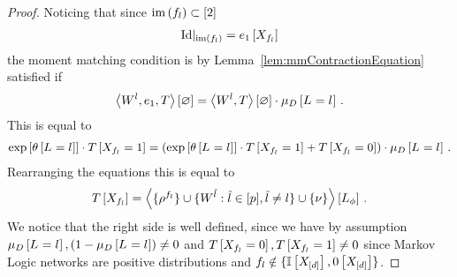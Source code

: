 \begin{proof}
	Noticing that since $\mathrm{im}\left(f_{l}\right)\subset[2]$
	\begin{align*}
		{\mathrm{Id}}|_{\mathrm{im}\left(f_{l}\right)} = e_{1}\left[X_{f_{l}}\right]
	\end{align*}
	the moment matching condition is by Lemma~\ref{lem:mmContractionEquation} satisfied if
	\begin{align*}
		\left\langle W^{l}, e_{1}, T\right\rangle \left[ \varnothing \right]
			= \left\langle W^{l},T\right\rangle \left[ \varnothing \right] \cdot \mu_{D}\left[L_{}=l_{}\right] \, . 
	\end{align*}
	This is equal to 
	\begin{align*}
		\mathrm{exp}\left[\theta\left[L_{}=l_{}\right]\right] \cdot T\left[X_{f_{l}}=1\right]
		= \left( \mathrm{exp}\left[\theta\left[L_{}=l_{}\right]\right] \cdot T\left[X_{f_{l}}=1\right] + T\left[X_{f_{l}}=0\right] \right) \cdot \mu_{D}\left[L_{}=l_{}\right] \, . 
	\end{align*}
	Rearranging the equations this is equal to 
	\begin{align*}
	 	T\left[X_{f_{l}}\right] 
		= \left\langle \{\rho^{f_{l}}\}
		\cup\{W^{\tilde{l}} : \tilde{l} \in [p], \tilde{l}\neq l\}
		\cup\{\nu\}\right\rangle \left[ L_\phi \right] \, . 
	\end{align*}
	We notice that the right side is well defined, since we have by assumption $\mu_{D}\left[L_{}=l_{}\right], (1- \mu_{D}\left[L_{}=l_{}\right]) \neq 0$ and $T\left[X_{f_{l}}=0\right], T\left[X_{f_{l}}=1\right] \neq 0$ since Markov Logic networks are positive distributions and $f_{l} \notin \{\mathbb{I}\left[X_{[d]}\right],0\left[X_{[d]}\right]\}$.
\end{proof}





